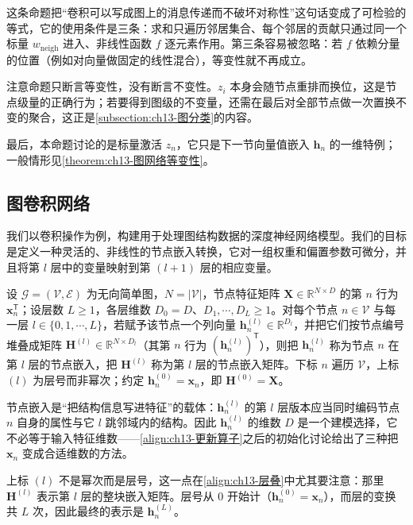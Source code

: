 \documentclass[../../main.tex]{subfiles}
\begin{document}
\begin{remark}
这条命题把“卷积可以写成图上的消息传递而不破坏对称性”这句话变成了可检验的等式，它的使用条件是三条：求和只遍历邻居集合、每个邻居的贡献只通过同一个标量 $w_{\mathrm{neigh}}$ 进入、非线性函数 $f$ 逐元素作用。第三条容易被忽略：若 $f$ 依赖分量的位置（例如对向量做固定的线性混合），等变性就不再成立。\par
注意命题只断言等变性，没有断言不变性。$z_i$ 本身会随节点重排而换位，这是节点级量的正确行为；若要得到图级的不变量，还需在最后对全部节点做一次置换不变的聚合，这正是\cref{subsection:ch13-图分类}的内容。\par
最后，本命题讨论的是标量激活 $z_n$，它只是下一节向量值嵌入 $\bm{h}_n$ 的一维特例；一般情形见\cref{theorem:ch13-图网络等变性}。
\end{remark}

\subsection{图卷积网络}\label{subsection:ch13-图卷积网络}

我们以卷积操作为例，构建用于处理图结构数据的深度神经网络模型。我们的目标是定义一种灵活的、非线性的节点嵌入转换，它对一组权重和偏置参数可微分，并且将第 $l$ 层中的变量映射到第 $(l+1)$ 层的相应变量。

\begin{definition}[节点嵌入]\label{definition:ch13-节点嵌入}
设 $\mathcal{G}=(\mathcal{V},\mathcal{E})$ 为无向简单图，$N=|\mathcal{V}|$，节点特征矩阵 $\bm{X}\in\mathbb{R}^{N\times D}$ 的第 $n$ 行为 $\bm{x}_n^{\mathsf T}$；设层数 $L\geqslant1$，各层维数 $D_0=D$、$D_1,\cdots,D_L\geqslant1$。对每个节点 $n\in\mathcal{V}$ 与每一层 $l\in\{0,1,\cdots,L\}$，若赋予该节点一个列向量 $\bm{h}_n^{(l)}\in\mathbb{R}^{D_l}$，并把它们按节点编号堆叠成矩阵 $\bm{H}^{(l)}\in\mathbb{R}^{N\times D_l}$（其第 $n$ 行为 $(\bm{h}_n^{(l)})^{\mathsf T}$），则把 $\bm{h}_n^{(l)}$ 称为节点 $n$ 在第 $l$ 层的节点嵌入，把 $\bm{H}^{(l)}$ 称为第 $l$ 层的节点嵌入矩阵。下标 $n$ 遍历 $\mathcal{V}$，上标 $(l)$ 为层号而非幂次；约定 $\bm{h}_n^{(0)}=\bm{x}_n$，即 $\bm{H}^{(0)}=\bm{X}$。
\end{definition}

\begin{remark}
节点嵌入是“把结构信息写进特征”的载体：$\bm{h}_n^{(l)}$ 的第 $l$ 层版本应当同时编码节点 $n$ 自身的属性与它 $l$ 跳邻域内的结构。因此 $\bm{h}_n^{(l)}$ 的维数 $D$ 是一个建模选择，它不必等于输入特征维数——\eqref{align:ch13-更新算子}之后的初始化讨论给出了三种把 $\bm{x}_n$ 变成合适维数的方法。\par
上标 $(l)$ 不是幂次而是层号，这一点在\eqref{align:ch13-层叠}中尤其要注意：那里 $\bm{H}^{(l)}$ 表示第 $l$ 层的整块嵌入矩阵。层号从 $0$ 开始计（$\bm{h}_n^{(0)}=\bm{x}_n$），而层的变换共 $L$ 次，因此最终的表示是 $\bm{h}_n^{(L)}$。
\end{remark}
\end{document}
